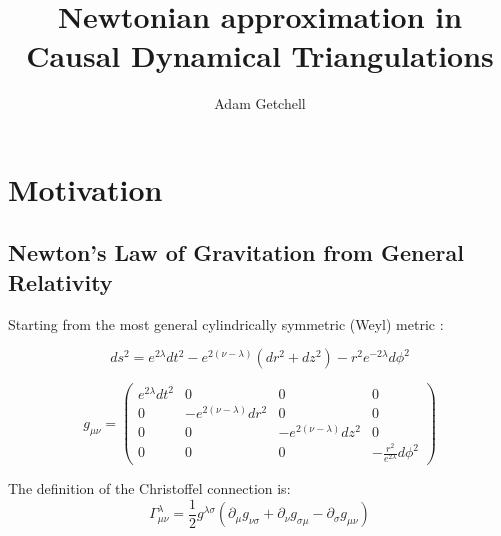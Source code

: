 \documentclass{article}
\title{Newtonian approximation in Causal Dynamical Triangulations}
\author{Adam Getchell}
\date{}
\begin{document}
\maketitle
\tableofcontents

\section{Motivation}

\subsection{Newton's Law of Gravitation from General Relativity}

Starting from the most general cylindrically symmetric (Weyl) metric \cite{synge_relativity}:

\begin{equation}
ds^{2}=e^{2\lambda}dt^{2}-e^{2\left(\nu-\lambda\right)}\left(dr^{2}+dz^{2}\right)-r^{2}e^{-2\lambda}d\phi^{2}\label{eq:weyl-metric}
\end{equation}

\begin{equation}
g_{\mu\nu}=\left(\begin{array}{cccc}
e^{2\lambda}dt^{2} & 0 & 0 & 0\\
0 & -e^{2\left(\nu-\lambda\right)}dr^{2} & 0 & 0\\
0 & 0 & -e^{2\left(\nu-\lambda\right)}dz^{2} & 0\\
0 & 0 & 0 & -\frac{r^{2}}{e^{2\lambda}}d\phi^{2}
\end{array}\right)\label{eq:general-axisymmetric-static-matrix-metric}
\end{equation}

The definition of the Christoffel connection is: \cite{carroll2003spacetime} 
\begin{equation}
\Gamma_{\mu\nu}^{\lambda}=\frac{1}{2}g^{\lambda\sigma}\left(\partial_{\mu}g_{\nu\sigma}+\partial_{\nu}g_{\sigma\mu}-\partial_{\sigma}g_{\mu\nu}\right)
\end{equation}
\end{document}
